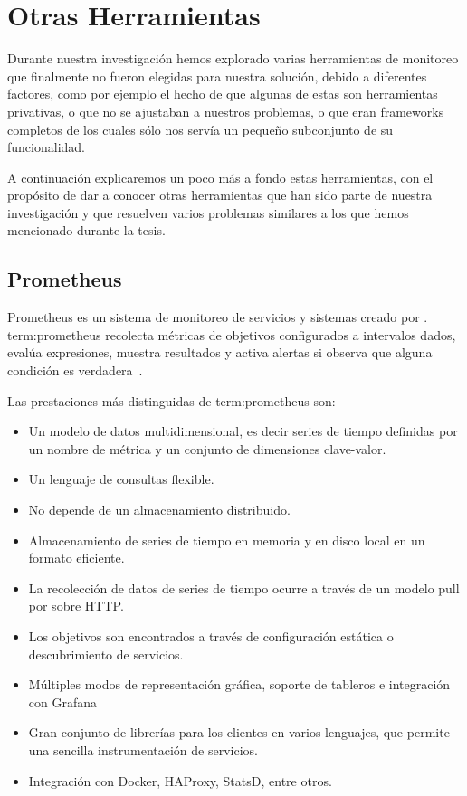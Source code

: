 \section{Otras Herramientas}
\label{anexo:B}

Durante nuestra investigación hemos explorado varias herramientas de monitoreo
que finalmente no fueron elegidas para nuestra solución, debido a diferentes
factores, como por ejemplo el hecho de que algunas de estas son herramientas
privativas, o que no se ajustaban a nuestros problemas, o que eran frameworks
completos de los cuales sólo nos servía un pequeño subconjunto de su
funcionalidad.

A continuación explicaremos un poco más a fondo estas herramientas, con el
propósito de dar a conocer otras herramientas que han sido parte de nuestra
investigación y que resuelven varios problemas similares a los que hemos
mencionado durante la tesis.

\subsection{Prometheus}

Prometheus es un sistema de monitoreo de servicios y sistemas creado por
. \gls{term:prometheus} recolecta métricas de
objetivos configurados a intervalos dados, evalúa expresiones, muestra
resultados y activa alertas si observa que alguna condición es
verdadera~\cite{prometheus}.

Las prestaciones más distinguidas de \gls{term:prometheus} son:

\begin{itemize}
  \item Un modelo de datos multidimensional, es decir series de tiempo
    definidas por un nombre de métrica y un conjunto de dimensiones
    clave-valor.
  \item Un lenguaje de consultas flexible.
  \item No depende de un almacenamiento distribuido.
  \item Almacenamiento de series de tiempo en memoria y en disco local en un
    formato eficiente.
  \item La recolección de datos de series de tiempo ocurre a través de un
    modelo pull por sobre HTTP.
  \item Los objetivos son encontrados a través de configuración estática o
    descubrimiento de servicios.
  \item Múltiples modos de representación gráfica, soporte de tableros e
    integración con Grafana
  \item Gran conjunto de librerías para los clientes en varios lenguajes, que
    permite una sencilla instrumentación de servicios.
  \item Integración con Docker, HAProxy, StatsD, entre otros.
\end{itemize}

